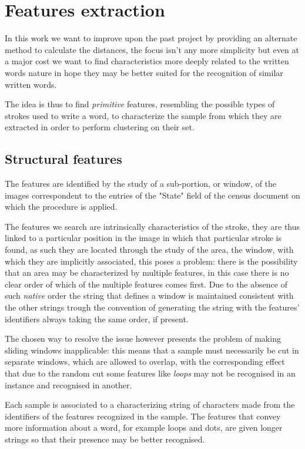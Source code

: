 \section{Features extraction}

In this work we want to improve upon the past project by providing an alternate method to calculate the distances, the focus isn't any more simplicity but even at a major cost we want to find characteristics more deeply related to the written words nature in hope they may be better suited for the recognition of similar written words.


The idea is thus to find \emph{primitive} features, resembling the possible types of strokes used to write a word, to characterize the sample from which they are extracted in order to perform clustering on their set.

\subsection{Structural features}

The features are identified by the study of a sub-portion, or window, of the images correspondent to the entries of the "State" field of the census document on which the procedure is applied.

The features we search are intrinsically characteristics of the stroke, they are thus linked to a particular position in the image in which that particular stroke is found, as such they are located through the study of the area, the window, with which they are implicitly associated, this poses a problem: there is the possibility that an area may be characterized by multiple features, in this case there is no clear order of which of the multiple features comes first.
Due to the absence of such \emph{native} order the string that defines a window is maintained consistent with the other strings trough the convention of generating the string with the features' identifiers always taking the same order, if present.

The chosen way to resolve the issue however presents the problem of making sliding windows inapplicable: this means that a sample must necessarily be cut in separate windows, which are allowed to overlap, with the corresponding effect that due to the random cut some features like \textit{loops} may not be recognised in an instance and recognised in another. 

Each sample is associated to a characterizing string of characters made from the identifiers of the features recognized in the sample.
The features that convey more information about a word, for example loops and dots, are given longer strings so that their presence may be better recognised.

